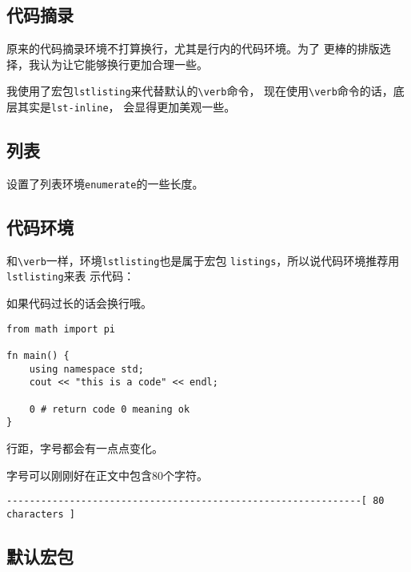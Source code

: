 \documentclass{peterlitsdoc}
\newcommand{\vb}{\verb}
\begin{document}
\subsection{代码摘录}

原来的代码摘录环境不打算换行，尤其是行内的代码环境。为了
更棒的排版选择，我认为让它能够换行更加合理一些。

我使用了宏包\vb|lstlisting|来代替默认的\verb|\verb|命令，
现在使用\verb|\verb|命令的话，底层其实是\vb|lst-inline|，
会显得更加美观一些。


\subsection{列表}

设置了列表环境\vb|enumerate|的一些长度。


\subsection{代码环境}

和\verb|\verb|一样，环境\vb|lstlisting|也是属于宏包
\vb|listings|，所以说代码环境推荐用\vb|lstlisting|来表
示代码：

\begin{pltrun}
如果代码过长的话会换行哦。
\begin{lstlisting}
from math import pi

fn main() {
    using namespace std;
    cout << "this is a code" << endl;

    0 # return code 0 meaning ok
}
\end{lstlisting}

行距，字号都会有一点点变化。
\end{pltrun}

字号可以刚刚好在正文中包含80个字符。
\begin{lstlisting}
--------------------------------------------------------------[ 80 characters ]
\end{lstlisting}


\subsection{默认宏包}
\end{document}

